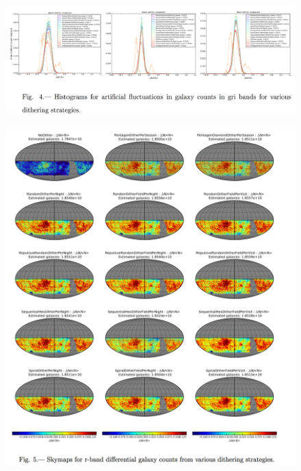 \begin{figure}[tbh!]
\vskip -0.1in
\includegraphics[angle=0,width=0.99\hsize:,clip]{figs/awan_fig4.png}
\caption{}
\label{fig:dithering_histograms}
\end{figure}

\begin{figure}[tbh!]
\vskip -0.1in
\includegraphics[angle=0,width=0.99\hsize:,clip]{figs/awan_fig5.png}
\caption{}
\label{fig:dithering_skymaps}
\end{figure}

